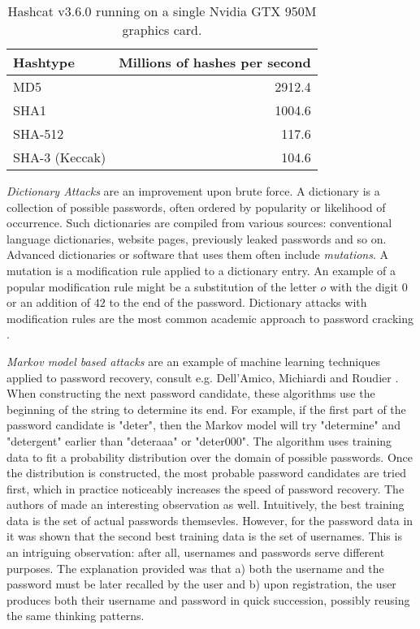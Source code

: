 \begin{table}
    \begin{center}
        \begin{tabular}{lr}
            Hashtype & Millions of hashes per second \\
            \hline
            MD5 & 2912.4 \\
            SHA1 & 1004.6 \\
            SHA-512 & 117.6 \\
            SHA-3 (Keccak) & 104.6
          \end{tabular}
      \end{center}
      \caption{Hashcat v3.6.0 running on a single Nvidia GTX 950M graphics card.}
      \label{table:hashcat-speed}
  \end{table}

\emph{Dictionary Attacks} are an improvement upon brute force. A dictionary is a collection of possible passwords, often ordered by popularity or likelihood of occurrence. Such dictionaries are compiled from various sources: conventional language dictionaries, website pages, previously leaked passwords and so on. Advanced dictionaries or software that uses them often include \emph{mutations}. A mutation is a modification rule applied to a dictionary entry. An example of a popular modification rule might be a substitution of the letter \(o\) with the digit \(0\) or an addition of \(42\) to the end of the password. Dictionary attacks with modification rules are the most common academic approach to password cracking \cite{zhang2010security, weir2010testing, kelley2012guess, shay2010encountering}.

\emph{Markov model based attacks} are an example of machine learning techniques applied to password recovery, consult e.g. Dell’Amico, Michiardi and Roudier \cite{dell:2010:password}. When constructing the next password candidate, these algorithms use the beginning of the string to determine its end. For example, if the first part of the password candidate is "deter", then the Markov model will try "determine" and "detergent" earlier than "deteraaa" or "deter000". The algorithm uses training data to fit a probability distribution over the domain of possible passwords. Once the distribution is constructed, the most probable password candidates are tried first, which in practice noticeably increases the speed of password recovery. The authors of \cite{dell:2010:password} made an interesting observation as well. Intuitively, the best training data is the set of actual passwords themsevles. However, for the password data in \cite{dell:2010:password} it was shown that the second best training data is the set of usernames. This is an intriguing observation: after all, usernames and passwords serve different purposes. The explanation provided was that a) both the username and the password must be later recalled by the user and b) upon registration, the user produces both their username and password in quick succession, possibly reusing the same thinking patterns.

